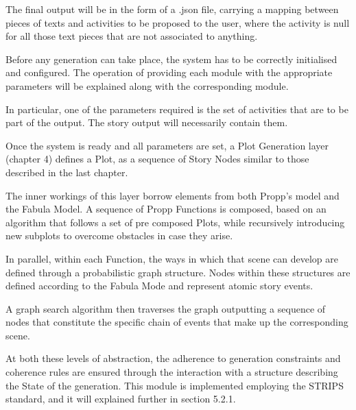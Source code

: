 \documentclass[12pt,a4paper,oneside]{report}
\begin{document}
The final output will be in the form of a .json file, carrying a mapping between pieces of texts and activities to be proposed to the user, where the activity is null for all those text pieces that are not associated to anything.

\bigskip

Before any generation can take place, the system has to be correctly initialised and configured. The operation of providing each module with the appropriate parameters will be explained along with the corresponding module.

In particular, one of the parameters required is the set of activities that are to be part of the output. The story output will necessarily contain them.

\bigskip

Once the system is ready and all parameters are set, a Plot Generation layer (chapter 4) defines a Plot, as a sequence of Story Nodes similar to those described in the last chapter. 

\bigskip

The inner workings of this layer borrow elements from both Propp's model and the Fabula Model. A sequence of Propp Functions is composed, based on an algorithm that follows a set of pre composed Plots, while recursively introducing new subplots to overcome obstacles in case they arise.

In parallel, within each Function, the ways in which that scene can develop are defined through a probabilistic graph structure. Nodes within these structures are defined according to the Fabula Mode and represent atomic story events. 

A graph search algorithm then traverses the graph outputting a sequence of nodes that constitute the specific chain of events that make up the corresponding scene.

\bigskip

At both these levels of abstraction, the adherence to generation constraints and coherence rules are ensured through the interaction with a structure describing the State of the generation. This module is implemented employing the STRIPS standard, and it will explained further in section 5.2.1.
\end{document}
